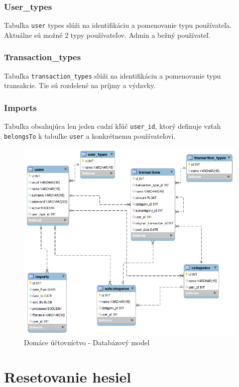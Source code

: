 \documentclass[12pt,oneside]{book}
\begin{document}
\subsubsection{User\_types}
Tabuľka \texttt{user} types slúži na identifikáciu a pomenovanie typu používateľa. Aktuálne sú možné 2 typy používateľov. Admin a bežný používateľ.
\subsubsection{Transaction\_types}
Tabuľka \texttt{transaction\_types} slúži na identifikáciu a pomenovanie typu transakcie. Tie sú rozdelené na príjmy a výdavky.
\subsubsection{Imports}
Tabuľka obsahujúca len jeden cudzí kľúč \texttt{user\_id}, ktorý definuje vzťah \texttt{belongsTo} k tabuľke \texttt{user} a konkrétnemu používateľovi.
\begin{figure}[ht]
  \centering
      \includegraphics[width=15cm]{databazovy_model}
  \caption{Domáce účtovníctvo - Databázový model}
  \label{DataModel}
\end{figure}    


\section{Resetovanie hesiel}
\end{document}
